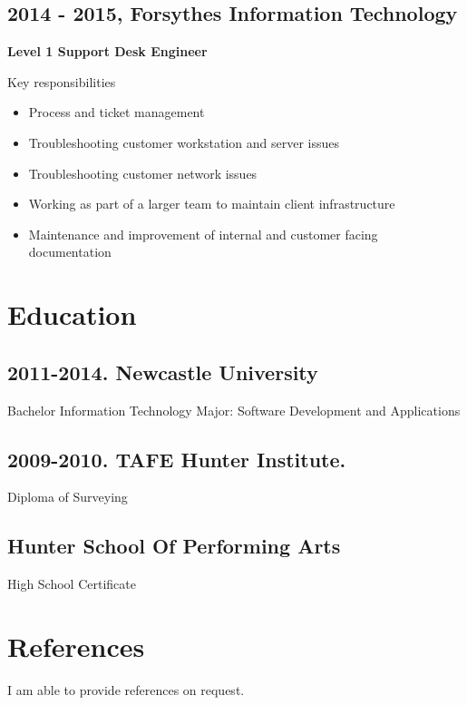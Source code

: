 \documentclass[11pt]{article}
\begin{document}
\subsection*{2014 - 2015, Forsythes Information Technology}
\label{sec:orge1c6e41}

\textbf{Level 1 Support Desk Engineer}

Key responsibilities

\begin{itemize}
\item Process and ticket management
\item Troubleshooting customer workstation and server issues
\item Troubleshooting customer network issues
\item Working as part of a larger team to maintain client infrastructure
\item Maintenance and improvement of internal and customer facing documentation
\end{itemize}
\section*{Education}
\label{sec:orgd67c555}

\subsection*{2011-2014. Newcastle University}
\label{sec:org59c0b8d}

Bachelor Information Technology
Major: Software Development and Applications
\subsection*{2009-2010. TAFE Hunter Institute.}
\label{sec:org95953d9}

Diploma of Surveying
\subsection*{Hunter School Of Performing Arts}
\label{sec:org34732b2}

High School Certificate
\section*{References}
\label{sec:orga45fdf5}

I am able to provide references on request.
\end{document}

